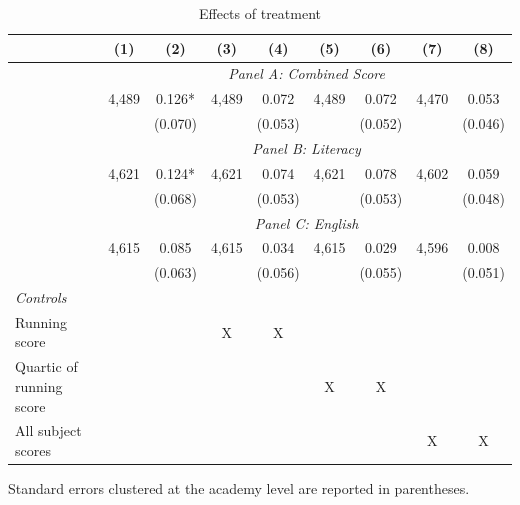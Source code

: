 \begin{table}[htbp]
  \centering
  \caption{Effects of treatment}
  \begin{threeparttable}
    \begin{tabular}{lrccccrcc}
    \toprule
    \toprule
          & \multicolumn{1}{c}{(1)} & (2)   & (3)   & (4)   & (5)   & \multicolumn{1}{c}{(6)} & (7)   & (8) \\
    \midrule
          & \multicolumn{8}{c}{\textit{Panel A: Combined Score}} \\
          & \multicolumn{1}{c}{4,489} & 0.126* & 4,489 & 0.072 & 4,489 & \multicolumn{1}{c}{0.072} & 4,470 & 0.053 \\
          &       & (0.070) &       & (0.053) &       & \multicolumn{1}{c}{(0.052)} &       & (0.046) \\
          & \multicolumn{8}{c}{\textit{Panel B: Literacy}} \\
          & \multicolumn{1}{c}{4,621} & 0.124* & 4,621 & 0.074 & 4,621 & \multicolumn{1}{c}{0.078} & 4,602 & 0.059 \\
          &       & (0.068) &       & (0.053) &       & \multicolumn{1}{c}{(0.053)} &       & (0.048) \\
          & \multicolumn{8}{c}{\textit{Panel C: English}} \\
          & \multicolumn{1}{c}{4,615} & 0.085 & 4,615 & 0.034 & 4,615 & \multicolumn{1}{c}{0.029} & 4,596 & 0.008 \\
          &       & (0.063) &       & (0.056) &       & \multicolumn{1}{c}{(0.055)} &       & (0.051) \\
    \midrule
    \textit{Controls} &       &       &       &       &       &       &       &  \\
    Running score &       &       & X     & X     &       &       &       &  \\
    Quartic of running score &       &       &       &       & X     & \multicolumn{1}{c}{X} &       &  \\
    All subject scores &       &       &       &       &       &       & X     & X \\
    \bottomrule
    \bottomrule
    \end{tabular}%
    \begin{tablenotes}
    \item Standard errors clustered at the academy level are reported in parentheses. 
    \end{tablenotes}
    
\end{threeparttable}    

  \label{tab:overall}%
\end{table}%